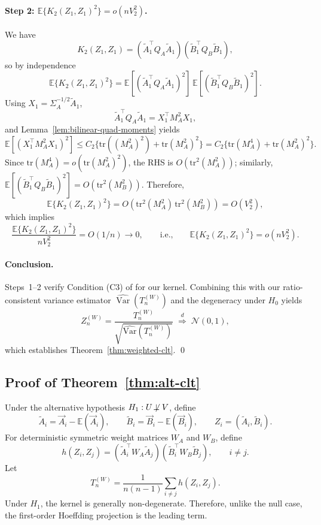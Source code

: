 \documentclass[12pt,reqno,oneside]{amsbook}
\theoremstyle{definition}
\theoremstyle{remark}
\DeclareMathOperator{\Var}{Var}
\begin{document}
\paragraph{Step 2: $\mathbb E\{K_2(Z_1,Z_1)^2\}=o(nV_2^2)$.}
We have
\[
K_2(Z_1,Z_1)
=
(\tilde A_1^\top Q_A\tilde A_1)
(\tilde B_1^\top Q_B\tilde B_1),
\]
so by independence
\[
\mathbb E\{K_2(Z_1,Z_1)^2\}
=
\mathbb E[(\tilde A_1^\top Q_A\tilde A_1)^2]\,
\mathbb E[(\tilde B_1^\top Q_B\tilde B_1)^2].
\]
Using $X_1=\Sigma_A^{-1/2}\tilde A_1$,
\[
\tilde A_1^\top Q_A\tilde A_1
=
X_1^\top M_A^2 X_1,
\]
and Lemma~\ref{lem:bilinear-quad-moments} yields
\[
\mathbb E[(X_1^\top M_A^2 X_1)^2]
\le
C_2\{\mbox{tr}((M_A^2)^2)+\mbox{tr}(M_A^2)^2\}
=
C_2\{\mbox{tr}(M_A^4)+\mbox{tr}(M_A^2)^2\}.
\]
Since $\mbox{tr}(M_A^4)=o(\mbox{tr}(M_A^2)^2)$, the RHS is
$O(\mbox{tr}^2(M_A^2))$; similarly,
$\mathbb E[(\tilde B_1^\top Q_B\tilde B_1)^2]=O(\mbox{tr}^2(M_B^2))$.
Therefore,
\[
\mathbb E\{K_2(Z_1,Z_1)^2\}
=
O\!\left(\mbox{tr}^2(M_A^2)\,\mbox{tr}^2(M_B^2)\right)
=
O(V_2^2),
\]
which implies
\[
\frac{\mathbb E\{K_2(Z_1,Z_1)^2\}}{nV_2^2}=O(1/n)\to 0,
\qquad\text{i.e.,}\qquad
\mathbb E\{K_2(Z_1,Z_1)^2\}=o(nV_2^2).
\]

\paragraph{Conclusion.}
Steps~1--2 verify Condition (C3) of \citet{HeZhongCuiMandrekar2023} for our
kernel. Combining this with our ratio-consistent variance estimator
$\widehat{\Var}(T_n^{(W)})$ and the degeneracy under $H_0$ yields
\[
Z_n^{(W)}=\frac{T_n^{(W)}}{\sqrt{\widehat{\mbox{Var}}(T_n^{(W)})}}
\;\stackrel{d}{\Rightarrow}\; \mathcal N(0,1),
\]
which establishes Theorem~\ref{thm:weighted-clt}. \qed


\subsection{Proof of Theorem~\ref{thm:alt-clt}}
\label{app:proof-alt-clt}

Under the alternative hypothesis $H_1: U\not\!\perp V$, define
\[
\tilde A_i=\vec A_i-\mathbb E(\vec A_i),
\qquad
\tilde B_i=\vec B_i-\mathbb E(\vec B_i),
\qquad
Z_i=(\tilde A_i,\tilde B_i).
\]
For deterministic symmetric weight matrices $W_A$ and $W_B$, define
\[
h(Z_i,Z_j)
=
(\tilde A_i^\top W_A\tilde A_j)
(\tilde B_i^\top W_B\tilde B_j),
\qquad i\ne j.
\]
Let
\[
T_n^{(W)}
=
\frac{1}{n(n-1)}
\sum_{i\ne j} h(Z_i,Z_j).
\]
Under $H_1$, the kernel is generally non-degenerate. Therefore, unlike the
null case, the first-order Hoeffding projection is the leading term.
\end{document}
